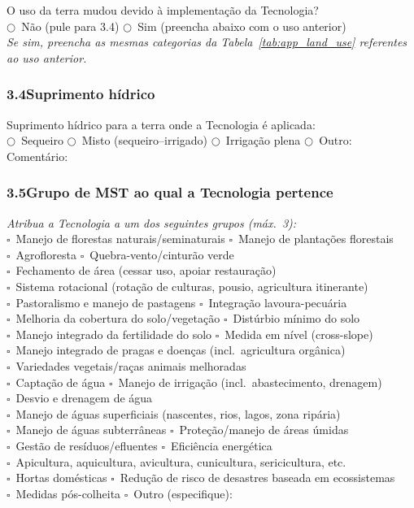 O uso da terra mudou devido à implementação da Tecnologia?\\
$\bigcirc$~Não (pule para 3.4) \qquad $\bigcirc$~Sim (preencha abaixo com o uso anterior)\\[4pt]
\textit{Se sim, preencha as mesmas categorias da Tabela~\ref{tab:app_land_use} referentes ao uso anterior.}

\subsubsection*{3.4\quad Suprimento hídrico}

Suprimento hídrico para a terra onde a Tecnologia é aplicada:\\
$\bigcirc$~Sequeiro \quad $\bigcirc$~Misto (sequeiro--irrigado) \quad $\bigcirc$~Irrigação plena \quad $\bigcirc$~Outro: \dotfill\\
Comentário: \dotfill

\subsubsection*{3.5\quad Grupo de MST ao qual a Tecnologia pertence}
\textit{Atribua a Tecnologia a um dos seguintes grupos (máx.\ 3):}\\[4pt]
$\square$~Manejo de florestas naturais/seminaturais \quad $\square$~Manejo de plantações florestais\\
$\square$~Agrofloresta \quad $\square$~Quebra-vento/cinturão verde\\
$\square$~Fechamento de área (cessar uso, apoiar restauração)\\
$\square$~Sistema rotacional (rotação de culturas, pousio, agricultura itinerante)\\
$\square$~Pastoralismo e manejo de pastagens \quad $\square$~Integração lavoura-pecuária\\
$\square$~Melhoria da cobertura do solo/vegetação \quad $\square$~Distúrbio mínimo do solo\\
$\square$~Manejo integrado da fertilidade do solo \quad $\square$~Medida em nível (cross-slope)\\
$\square$~Manejo integrado de pragas e doenças (incl.\ agricultura orgânica)\\
$\square$~Variedades vegetais/raças animais melhoradas\\
$\square$~Captação de água \quad $\square$~Manejo de irrigação (incl.\ abastecimento, drenagem)\\
$\square$~Desvio e drenagem de água\\
$\square$~Manejo de águas superficiais (nascentes, rios, lagos, zona ripária)\\
$\square$~Manejo de águas subterrâneas \quad $\square$~Proteção/manejo de áreas úmidas\\
$\square$~Gestão de resíduos/efluentes \quad $\square$~Eficiência energética\\
$\square$~Apicultura, aquicultura, avicultura, cunicultura, sericicultura, etc.\\
$\square$~Hortas domésticas \quad $\square$~Redução de risco de desastres baseada em ecossistemas\\
$\square$~Medidas pós-colheita \quad $\square$~Outro (especifique): \dotfill

